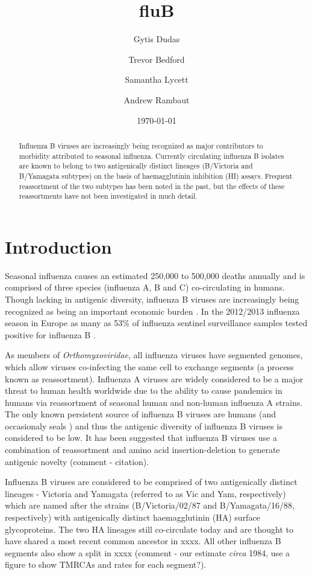 \documentclass[11pt,oneside,letterpaper]{article}
\title{\vspace{1.0cm} \LARGE \bf fluB}
\author[1]{Gytis Dudas}
\author[1]{Trevor Bedford}
\author[1]{Samantha Lycett}
\author[1,2]{Andrew Rambaut}
\affil[1]{Institute of Evolutionary Biology, University of Edinburgh, Edinburgh, UK}
\affil[2]{Fogarty International Center, National Institutes of Health, Bethesda, MD, USA.}
\date{\today}
\begin{document}
\maketitle

\begin{abstract}

Influenza B viruses are increasingly being recognized as major contributors to morbidity attributed to seasonal influenza. 
Currently circulating influenza B isolates are known to belong to two antigenically distinct lineages (B/Victoria and B/Yamagata subtypes) on the basis of haemagglutinin inhibition (HI) assays. 
Frequent reassortment of the two subtypes has been noted in the past, but the effects of these reassortments have not been investigated in much detail.

\end{abstract}

\pagebreak


\section*{Introduction}
Seasonal influenza causes an estimated 250,000 to 500,000 deaths annually and is comprised of three species (influenza A, B and C) co-circulating in humans. Though lacking in antigenic diversity, influenza B viruses are increasingly being recognized as being an important economic burden \cite{paul-glezen2013}. 
In the 2012/2013 influenza season in Europe as many as 53\% of influenza sentinel surveillance samples tested positive for influenza B \cite{ECDC1213}. 

As members of \textit{Orthomyxoviridae}, all influenza viruses have segmented genomes, which allow viruses co-infecting the same cell to exchange segments (a process known as reassortment). 
Influenza A viruses are widely considered to be a major threat to human health worldwide due to the ability to cause pandemics in humans via reassortment of seasonal human and non-human influenza A strains. 
The only known persistent source of influenza B viruses are humans (and occasionaly seals \cite{osterhaus2000}) and thus the antigenic diversity of influenza B viruses is considered to be low. 
It has been suggested that influenza B viruses use a combination of reassortment and amino acid insertion-deletion to generate antigenic novelty (comment - citation).

Influenza B viruses are considered to be comprised of two antigenically distinct lineages - Victoria and Yamagata (referred to as Vic and Yam, respectively) which are named after the strains (B/Victoria/02/87 and B/Yamagata/16/88, respectively) with antigenically distinct haemagglutinin (HA) surface glycoproteins. 
The two HA lineages still co-circulate today and are thought to have shared a most recent common ancestor in xxxx. 
All other influenza B segments also show a split in xxxx (comment - our estimate \textit{circa} 1984, use a figure to show TMRCAs and rates for each segment?).
\end{document}
